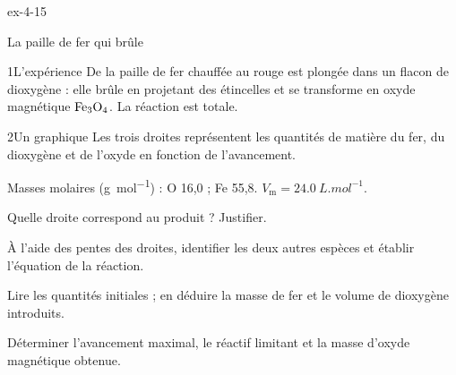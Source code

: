 \begin{blocLivre}{ex-4-15}
\begin{exercice}[3]{La paille de fer qui brûle}
\begin{docu}{1}{L'expérience}
De la paille de fer chauffée au rouge est plongée dans un flacon de dioxygène : elle brûle en projetant des étincelles et
se transforme en oxyde magnétique $\ce{Fe3O4}$. La réaction est totale.
\end{docu}
\begin{docu}{2}{Un graphique}
Les trois droites représentent les quantités de matière du fer, du dioxygène et de l'oxyde en fonction de l'avancement.
\end{docu}
\begin{donnees}
Masses molaires (\unit{g.mol^{-1}}) : O 16,0 ; Fe 55,8. $V_\mathrm{m}=\qty{24,0}{L.mol^{-1}}$.
\end{donnees}
\begin{questions}
\item Quelle droite correspond au produit ? Justifier.
\item \initiative À l'aide des pentes des droites, identifier les deux autres espèces et établir l'équation de la réaction.
\item Lire les quantités initiales ; en déduire la masse de fer et le volume de dioxygène introduits.
\item Déterminer l'avancement maximal, le réactif limitant et la masse d'oxyde magnétique obtenue.
\end{questions}
\end{exercice}
\end{blocLivre}

